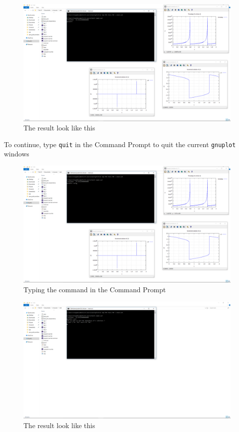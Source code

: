 \documentclass[a4paper,oneside]{book}
\numberwithin{equation}{chapter}
\begin{document}
	\begin{figure}[H]
		\centering	\includegraphics[width=15cm]{wfig8}
		\caption{The result look like this}
	\end{figure}
	\noindent To continue, type \texttt{quit} in the Command Prompt to quit the current \texttt{gnuplot} windows
	\begin{figure}[H]
		\centering	\includegraphics[width=15cm]{wfig81}
		\caption{Typing the command in the Command Prompt}
	\end{figure}
	\begin{figure}[H]
		\centering	\includegraphics[width=15cm]{wfig82}
		\caption{The result look like this}
	\end{figure}
\end{document}
